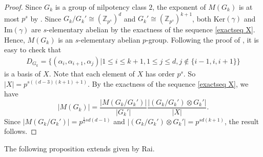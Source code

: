 \documentclass[preprint,sort&compress,12pt]{elsarticle}
\numberwithin{equation}{section}
\theoremstyle{definition}
\newcommand{\Z}{\mathbb{Z}}
\begin{document}
\begin{proof}
 Since $G_k$ is a group of nilpotency class $2$, the exponent of $M(G_k)$ is at most $p^s$ by \cite[Corollary~2.6]{Jones1974}.
Since $G_k/G_k' \cong (\Z_{p^s})^d$ and ${G_k' \cong (\Z_{p^s})^{k+1}}$, both Ker$(\gamma)$ and Im$(\gamma)$ are $s$-elementary abelian by the exactness of the sequence \eqref{exactseq X}. Hence, $M(G_k)$ is an $s$-elementary abelian $p$-group.
Following the proof of \cite[Proposition 10]{Rai2023}, it is easy to check that  
\begin{align*}
    D_{G_k}=\{(\alpha_i,\alpha_{i+1},\alpha_j)| 1\leq i \leq k+1, 1\leq j \leq d,  j \notin \{ i-1,i,i+1\}\}
\end{align*}
is a basis of $X$. Note that each element of $X$ has order $p^s$. So $|X|=p^{s((d-3)(k+1)+1)}$. 
By the exactness of the sequence \eqref{exactseq X}, we have 
\[|M(G_k)|=\frac{|M(G_k/G_k')|}{|G_k'|}\frac{|(G_k/G_k') \otimes G_k'|}{|X|}.\]
Since $|M(G_k/G_k')|=p^{\frac{1}{2}sd(d-1)}$ and $|(G_k/G_k') \otimes G_k'|=p^{sd(k+1)}$, the result follows.
\end{proof}
The following proposition extends \cite[Proposition 11]{Rai2023} given by Rai.
   
\end{document}
